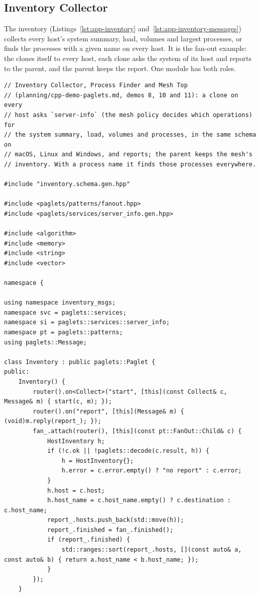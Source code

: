 \subsection{Inventory Collector}\label{sec:examples-inventory}

The inventory (Listings~\ref{lst:app-inventory}
and~\ref{lst:app-inventory-messages}) collects every host's system
summary, load, volumes and
largest processes, or finds the processes with a given name on every
host. It is the fan-out example: the \paglet{} clones itself to every
host, each clone asks the  system \paglet{} of its host
and reports to the parent, and the parent keeps the report. One module
has both roles.

\begin{lstlisting}[style=paglets-cpp,caption={The Inventory Collector \src{cpp/examples/inventory/inventory.cpp}},label={lst:app-inventory}]
// Inventory Collector, Process Finder and Mesh Top
// (planning/cpp-demo-paglets.md, demos 8, 10 and 11): a clone on every
// host asks `server-info` (the mesh policy decides which operations) for
// the system summary, load, volumes and processes, in the same schema on
// macOS, Linux and Windows, and reports; the parent keeps the mesh's
// inventory. With a process name it finds those processes everywhere.

#include "inventory.schema.gen.hpp"

#include <paglets/patterns/fanout.hpp>
#include <paglets/services/server_info.gen.hpp>

#include <algorithm>
#include <memory>
#include <string>
#include <vector>

namespace {

using namespace inventory_msgs;
namespace svc = paglets::services;
namespace si = paglets::services::server_info;
namespace pt = paglets::patterns;
using paglets::Message;

class Inventory : public paglets::Paglet {
public:
    Inventory() {
        router().on<Collect>("start", [this](const Collect& c, Message& m) { start(c, m); });
        router().on("report", [this](Message& m) { (void)m.reply(report_); });
        fan_.attach(router(), [this](const pt::FanOut::Child& c) {
            HostInventory h;
            if (!c.ok || !paglets::decode(c.result, h)) {
                h = HostInventory{};
                h.error = c.error.empty() ? "no report" : c.error;
            }
            h.host = c.host;
            h.host_name = c.host_name.empty() ? c.destination : c.host_name;
            report_.hosts.push_back(std::move(h));
            report_.finished = fan_.finished();
            if (report_.finished) {
                std::ranges::sort(report_.hosts, [](const auto& a, const auto& b) { return a.host_name < b.host_name; });
            }
        });
    }


\end{lstlisting}
